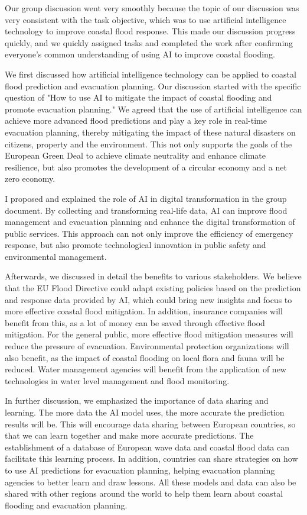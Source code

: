 \documentclass[UTF8,a4paper,AutoFakeBold,AutoFakeSlant]{article}
\begin{document}
Our group discussion went very smoothly because the topic of our discussion was very consistent with the task objective, which was to use artificial intelligence technology to improve coastal flood response. This made our discussion progress quickly, and we quickly assigned tasks and completed the work after confirming everyone's common understanding of using AI to improve coastal flooding.

We first discussed how artificial intelligence technology can be applied to coastal flood prediction and evacuation planning. Our discussion started with the specific question of "How to use AI to mitigate the impact of coastal flooding and promote evacuation planning." We agreed that the use of artificial intelligence can achieve more advanced flood predictions and play a key role in real-time evacuation planning, thereby mitigating the impact of these natural disasters on citizens, property and the environment. This not only supports the goals of the European Green Deal to achieve climate neutrality and enhance climate resilience, but also promotes the development of a circular economy and a net zero economy.

I proposed and explained the role of AI in digital transformation in the group document. By collecting and transforming real-life data, AI can improve flood management and evacuation planning and enhance the digital transformation of public services. This approach can not only improve the efficiency of emergency response, but also promote technological innovation in public safety and environmental management.

Afterwards, we discussed in detail the benefits to various stakeholders. We believe that the EU Flood Directive could adapt existing policies based on the prediction and response data provided by AI, which could bring new insights and focus to more effective coastal flood mitigation. In addition, insurance companies will benefit from this, as a lot of money can be saved through effective flood mitigation. For the general public, more effective flood mitigation measures will reduce the pressure of evacuation. Environmental protection organizations will also benefit, as the impact of coastal flooding on local flora and fauna will be reduced. Water management agencies will benefit from the application of new technologies in water level management and flood monitoring.

In further discussion, we emphasized the importance of data sharing and learning. The more data the AI ​​model uses, the more accurate the prediction results will be. This will encourage data sharing between European countries, so that we can learn together and make more accurate predictions. The establishment of a database of European wave data and coastal flood data can facilitate this learning process. In addition, countries can share strategies on how to use AI predictions for evacuation planning, helping evacuation planning agencies to better learn and draw lessons. All these models and data can also be shared with other regions around the world to help them learn about coastal flooding and evacuation planning.
\end{document}
